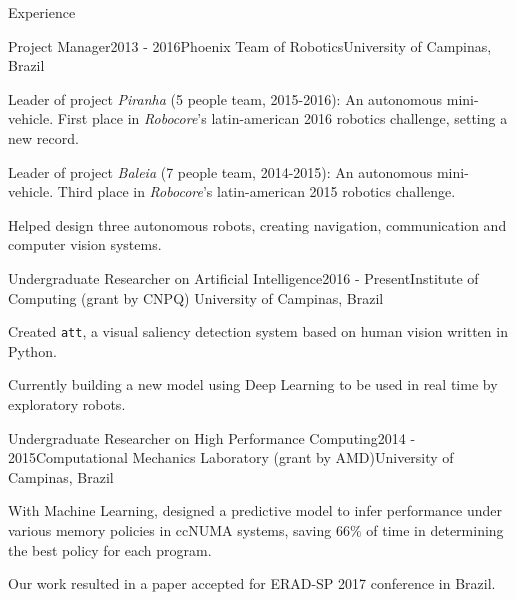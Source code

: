 \documentclass[8pt]{resume}
\newcommand{\tit}[1]{\textit{#1}}
\newcommand{\ttt}[1]{\texttt{#1}}
\begin{document}
\begin{rSection}{Experience}

\begin{rSubsection}{Project Manager}{2013 - 2016}{Phoenix Team of Robotics}{University of Campinas, Brazil}
    \item Leader of project \tit{Piranha} (5 people team, 2015-2016):
        An autonomous mini-vehicle.
        First place in \tit{Robocore}'s latin-american 2016 robotics challenge, setting a new record.
    \item Leader of project \tit{Baleia} (7 people team, 2014-2015):
        An autonomous mini-vehicle.
        Third place in \tit{Robocore}'s latin-american 2015 robotics challenge.
    \item Helped design three autonomous robots, creating navigation,
        communication and computer vision systems.
\end{rSubsection}

\begin{rSubsection}{Undergraduate Researcher on Artificial Intelligence}{2016 - Present}{Institute of Computing (grant by CNPQ)}
    {University of Campinas, Brazil}
    \item Created \ttt{att}, a visual saliency detection system based on human
        vision written in Python.
    \item Currently building a new model using Deep Learning to be used in real
        time by exploratory robots.
\end{rSubsection}

\begin{rSubsection}{Undergraduate Researcher on High Performance Computing}{2014 - 2015}{Computational Mechanics Laboratory (grant by AMD)}{University of Campinas, Brazil}
    \item With Machine Learning, designed a predictive model to infer performance under
        various memory policies in ccNUMA systems, saving $66\%$ of time in
        determining the best policy for each program.
    \item Our work resulted in a paper accepted for ERAD-SP 2017 conference in Brazil.
\end{rSubsection}


\end{rSection}
\end{document}
